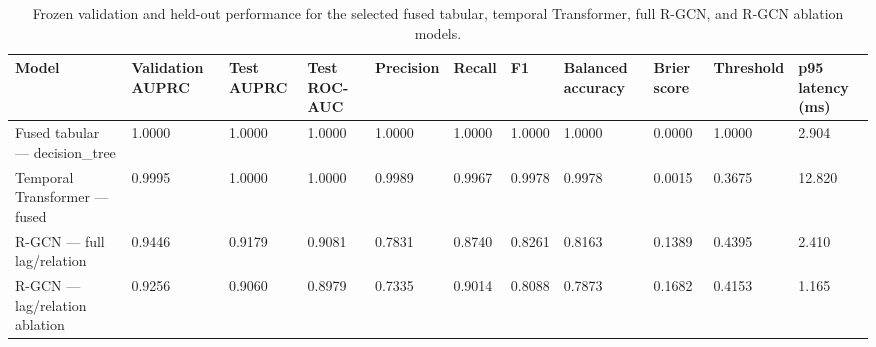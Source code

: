\begin{table}
\caption{Frozen validation and held-out performance for the selected fused tabular, temporal Transformer, full R-GCN, and R-GCN ablation models.}
\label{tab:model-performance}
\begin{tabular}{lllllllllll}
\toprule
Model & Validation AUPRC & Test AUPRC & Test ROC-AUC & Precision & Recall & F1 & Balanced accuracy & Brier score & Threshold & p95 latency (ms) \\
\midrule
Fused tabular — decision\_tree & 1.0000 & 1.0000 & 1.0000 & 1.0000 & 1.0000 & 1.0000 & 1.0000 & 0.0000 & 1.0000 & 2.904 \\
Temporal Transformer — fused & 0.9995 & 1.0000 & 1.0000 & 0.9989 & 0.9967 & 0.9978 & 0.9978 & 0.0015 & 0.3675 & 12.820 \\
R-GCN — full lag/relation & 0.9446 & 0.9179 & 0.9081 & 0.7831 & 0.8740 & 0.8261 & 0.8163 & 0.1389 & 0.4395 & 2.410 \\
R-GCN — lag/relation ablation & 0.9256 & 0.9060 & 0.8979 & 0.7335 & 0.9014 & 0.8088 & 0.7873 & 0.1682 & 0.4153 & 1.165 \\
\bottomrule
\end{tabular}
\end{table}
